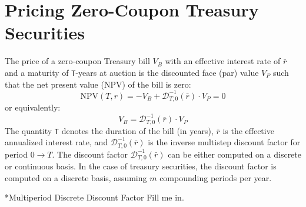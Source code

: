 \documentclass[11pt]{article}
\makeatletter
\theoremstyle{definition}
\renewcommand\subsection{\@startsection
	{subsection}{2}{0mm}
	{-0.05in}
	{0.5\baselineskip}
	{\normalfont\normalsize\bfseries}}
\makeatother
\begin{document}
\section*{Pricing Zero-Coupon Treasury Securities}\label{sec:zero-coupon-treasury-securities}
The price of a zero-coupon Treasury bill $V_{B}$ with an effective interest rate of $\bar{r}$ and a maturity of \texttt{T}-years at auction 
is the discounted face (par) value $V_{P}$ such that the net present value (NPV) of the bill is zero:
\begin{equation}    
\text{NPV}(T,r) = -V_{B} + \mathcal{D}_{T,0}^{-1}(\bar{r})\cdot{V_{P}} = 0
\end{equation}
or equivalently:
\begin{equation}
    V_{B} = \mathcal{D}_{T,0}^{-1}(\bar{r})\cdot{V_{P}}
\end{equation}
The quantity \texttt{T} denotes the duration of the bill (in years), 
$\bar{r}$ is the effective annualized interest rate,  and $\mathcal{D}_{T,0}^{-1}(\bar{r})$ is the inverse multistep discount factor
for period $0\rightarrow{T}$. 
The discount factor $\mathcal{D}_{T,0}^{-1}(\bar{r})$ can be either computed on a discrete or continuous basis. 
In the case of treasury securities, the discount factor is computed on a discrete basis, assuming $m$ compounding periods per year.

\subsection*{Multiperiod Discrete Discount Factor}
Fill me in.
\end{document}
